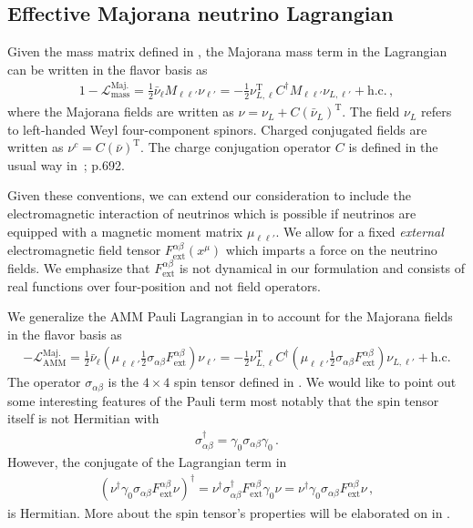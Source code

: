 \subsection{Effective Majorana neutrino Lagrangian}
\label{sec:nuaction}
Given the mass matrix defined in , the Majorana mass term in the Lagrangian can be written in the flavor basis as
\begin{alignat}{1}
    \label{mass:1} -\mathcal{L}_{\mathrm{mass}}^{\mathrm{Maj.}}=\frac{1}{2}\bar\nu_{\ell}M_{\ell\ell'}\nu_{\ell'}=
    -\frac{1}{2}\nu_{L,\ell}^\mathrm{T}C^{\dag}M_{\ell\ell'}\nu_{L,\ell'}+\mathrm{h.c.}\,,
\end{alignat}
where the Majorana fields are written as $\nu=\nu_{L}+C(\bar\nu_{L})^\mathrm{T}$. The field $\nu_{L}$ refers to left-handed Weyl four-component spinors. Charged conjugated fields are written as $\nu^{c}=C(\bar\nu)^\mathrm{T}$. The charge conjugation operator $C$ is defined in the usual way in~\cite{Itzykson:1980rh}; p.692.

Given these conventions, we can extend our consideration to include the electromagnetic interaction of neutrinos which is possible if neutrinos are equipped with a magnetic moment matrix $\mu_{\ell\ell'}$. We allow for a fixed \emph{external} electromagnetic field tensor $F^{\alpha\beta}_\mathrm{ext}(x^{\mu})$ which imparts a force on the neutrino fields. We emphasize that $F^{\alpha\beta}_\mathrm{ext}$ is not dynamical in our formulation and consists of real functions over four-position and not field operators.

We generalize the AMM Pauli Lagrangian in  to account for the Majorana fields in the flavor basis as
\begin{align}
\label{moment:1}
    -\mathcal{L}_{\mathrm{AMM}}^\mathrm{Maj.}=\frac{1}{2}\bar\nu_{\ell}\left(\mu_{\ell\ell'}\frac{1}{2}\sigma_{\alpha\beta}F^{\alpha\beta}_\mathrm{ext}\right)\nu_{\ell'}=
    -\frac{1}{2}\nu_{L,\ell}^\mathrm{T}C^{\dag}\left(\mu_{\ell\ell'}\frac{1}{2}\sigma_{\alpha\beta}F^{\alpha\beta}_\mathrm{ext}\right)\nu_{L,\ell'}+\mathrm{h.c.}
\end{align}
The operator $\sigma_{\alpha\beta}$ is the $4\times 4$ spin tensor defined in . We would like to point out some interesting features of the Pauli term most notably that the spin tensor itself is not Hermitian with
\begin{align}
\label{notherm:1}
\sigma_{\alpha\beta}^{\dag} = \gamma_{0}\sigma_{\alpha\beta}\gamma_{0}\,.
\end{align}
However, the conjugate of the Lagrangian term in 
\begin{align}
\left(\nu^{\dag}\gamma_{0}\sigma_{\alpha\beta}F^{\alpha\beta}_\mathrm{ext}\nu\right)^{\dag} = \nu^{\dag}\sigma_{\alpha\beta}^{\dag}F^{\alpha\beta}_\mathrm{ext}\gamma_{0}\nu = \nu^{\dag}\gamma_{0}\sigma_{\alpha\beta}F^{\alpha\beta}_\mathrm{ext}\nu\,,
\end{align}
is Hermitian. More about the spin tensor's properties will be elaborated on in .

